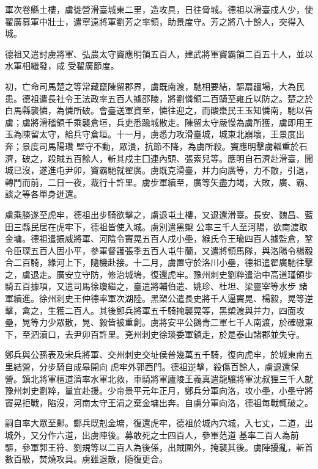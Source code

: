 \begin{pinyinscope}
 軍次卷縣土樓，虜徙營滑臺城東二里，造攻具，日往脅城。德祖以滑臺戍人少，使翟廣募軍中壯士，遣寧遠將軍劉芳之率領，助景度守。芳之將八十餘人，突得入城。



 德祖又遣討虜將軍、弘農太守竇應明領五百人，建武將軍竇霸領二百五十人，並以水軍相繼發，咸
 受翟廣節度。



 初，亡命司馬楚之等常藏竄陳留郡界，虜既南渡，馳相要結，驅扇疆場，大為民患。德祖遣長社令王法政率五百人據邵陵，將劉憐領二百騎至雍丘以防之。楚之於白馬縣襲憐，為憐所破。會臺送軍資至，憐往迎之，而酸棗民王玉知憐南，馳以告虜；虜將滑稽領千乘襲倉垣，兵吏悉踰城散走。陳留太守嚴慢為虜所獲，虜即用王玉為陳留太守，給兵守倉垣。十一月，虜悉力攻滑臺城，城東北崩壞，王景度出奔；景度司馬陽瓚
 堅守不動，眾潰，抗節不降，為虜所殺。竇應明擊虜輜重於石濟，破之，殺賊五百餘人，斬其戍主囗連內頭、張索兒等。應明自石濟赴滑臺，聞城已沒，遂進屯尹卯，竇霸馳就翟廣。虜既克滑臺，并力向廣等，力不敵，引退，轉鬥而前，二日一夜，裁行十許里。虜步軍續至，廣等矢盡力竭，大敗，廣、霸、談之等各單身迸還。



 虜乘勝遂至虎牢，德祖出步騎欲擊之，虜退屯土樓，又退還滑臺。長安、魏昌、藍田三縣民居在虎牢下，德祖皆使入城。虜別遣黑槊
 公率三千人至河陽，欲南渡取金墉。德祖遣振威將軍、河陰令竇晃五百人戍小壘，緱氏令王瑜四百人據監倉，鞏令臣琛五百人固小平，參軍督護張季五百人屯牛蘭，又遣將領馬隊，與洛陽令楊毅合二百騎，緣河上下，隨機赴接。十二月，虜置守於洛川小壘，德祖遣翟廣馳往擊之，虜退走。廣安立守防，修治城塢，復還虎牢。豫州刺史劉粹遣治中高道瑾領步騎五百據項，又遣司馬徐瓊繼之，臺遣將輔伯遣、姚珍、杜坦、梁靈宰等水步
 諸軍續進。徐州刺史王仲德率軍次湖陸。黑槊公遣長史將千人逼竇晃、楊毅，晃等逆擊，禽之，生獲二百人。其後鄭兵將軍五千騎掩襲晃等，黑槊渡與并力，四面攻壘，晃等力少眾散，晃、毅皆被重創。虜將安平公鵝青二軍七千人南渡，於確磝東下，至泗瀆口，去尹卯百許里。兗州刺史徐琰委軍鎮走，於是泰山諸郡並失守。



 鄭兵與公孫表及宋兵將軍、交州刺史交址侯普幾萬五千騎，復向虎牢，於城東南五里結營，分步騎自成皋開向
 虎牢外郭西門。德祖逆擊，殺傷百餘人，虜退還保營。鎮北將軍檀道濟率水軍北救，車騎將軍廬陵王義真遣龍驤將軍沈叔狸三千人就豫州刺史劉粹，量宜赴援。少帝景平元年正月，鄭兵分軍向洛，攻小壘，小壘守將竇晃拒戰，陷沒，河南太守王涓之棄金墉出奔。自虜分軍向洛，德祖每戰輒破之。



 嗣自率大眾至鄴。鄭兵既剋金墉，復還虎牢，德祖於城內穴城，入七丈，二道，出城外，又分作六道，出虜陣後。募敢死之士四百人，參軍范道
 基率二百人為前驅，參軍郭王符、劉規等以二百人為後係，出賊圍外，掩襲其後。虜陣擾亂，斬首數百級，焚燒攻具。虜雖退散，隨復更合。




\end{pinyinscope}
